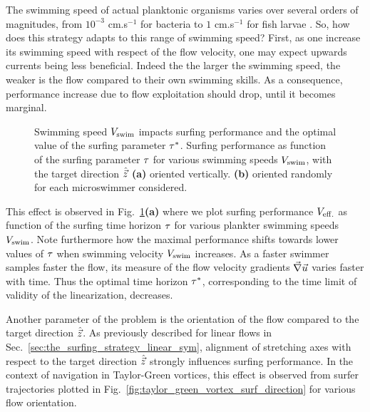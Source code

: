 The swimming speed of actual planktonic organisms varies over several orders of magnitudes, from $10^{-3}$ cm.s$^{-1}$ for bacteria to $1$ cm.s$^{-1}$ for fish larvae \citep{peters2000effects, fuchs2016seascape}.
So, how does this strategy adapts to this range of swimming speed?
First, as one increase its swimming speed with respect of the flow velocity, one may expect upwards currents being less beneficial.
Indeed the the larger the swimming speed, the weaker is the flow compared to their own swimming skills.
As a consequence, performance increase due to flow exploitation should drop, until it becomes marginal.
\begin{figure}%
	\centering
	
	\caption[Swimming speed $\SwimmingVelocity$ impacts surfing performance and the optimal value of the surfing parameter $\TimeHorizonOpt$.]{
		Swimming speed $\SwimmingVelocity$ impacts surfing performance and the optimal value of the surfing parameter $\TimeHorizonOpt$.
		Surfing performance as function of the surfing parameter $\tau$ for various swimming speeds $\SwimmingVelocity$, with the target direction $\hat{\vec{z}}$
		\textbf{(a)} oriented vertically.
		\textbf{(b)} oriented randomly for each microswimmer considered.
	}
	\label{fig:taylor_green_vortex_tau_performance_vs_and_rdir}
\end{figure}

This effect is observed in Fig.~\ref{fig:taylor_green_vortex_tau_performance_vs_and_rdir}\textbf{(a)} where we plot surfing performance $V_{\mathrm{eff.}}$ as function of the surfing time horizon $\tau$ for various plankter swimming speeds $\SwimmingVelocity$.
Note furthermore how the maximal performance shifts towards lower values of $\tau$ when swimming velocity $\SwimmingVelocity$ increases.
As a faster swimmer samples faster the flow, its measure of the flow velocity gradients $\vec{\nabla} \vec{u}$ varies faster with time.
Thus the optimal time horizon $\TimeHorizonOpt$, corresponding to the time limit of validity of the linearization, decreases.


Another parameter of the problem is the orientation of the flow compared to the target direction $\hat{\vec{z}}$.
As previously described for linear flows in Sec.~\ref{sec:the_surfing_strategy_linear_sym}, alignment of stretching axes with respect to the target direction $\hat{\vec{z}}$ strongly influences surfing performance.
In the context of navigation in Taylor-Green vortices, this effect is observed from surfer trajectories plotted in Fig.~\ref{fig:taylor_green_vortex_surf_direction} for various flow orientation.

